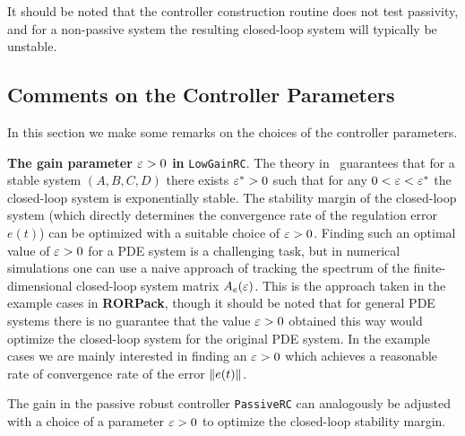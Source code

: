 \documentclass[11pt, a4paper]{amsart}
\newcommand{\COMMapproxRC}[1]{{\color{gray}#1}}
\renewcommand{\COMMapproxRC}[1]{}
\theoremstyle{definition}
\numberwithin{equation}{section}
\newcommand{\RORname}{\textbf{RORPack}}
\begin{document}
\begin{itemize}
It should be noted that the controller construction routine does not test passivity, and for a non-passive system the resulting closed-loop system will typically be unstable.

	\bigskip

     \COMMapproxRC{
     \item An ``approximate robust controller'' based on the reference~\cite{HumKur19} for finite-dimensional approximate control design for systems with infinite-dimensional output spaces.\\[1ex]
	 Calling sequence for the construction:\\[-1ex]
	   \begin{quotation}
	     \texttt{ApproximateRC(\dots)}
	   \end{quotation}
	 }
\end{itemize}

\subsection{Comments on the Controller Parameters}

In this section we make some remarks on the choices of the controller parameters.

\textbf{The gain parameter $\varepsilon>0$ in }\texttt{LowGainRC}. 
The theory in~\cite{HamPoh00,RebWei03} guarantees that for a stable system $(A,B,C,D)$ there exists $\varepsilon^\ast>0$ such that for any $0<\varepsilon<\varepsilon^\ast$ the closed-loop system is exponentially stable. The stability margin of the closed-loop system (which directly determines the convergence rate of the regulation error $e(t)$) can be optimized with a suitable choice of $\varepsilon>0$. Finding such an optimal value of $\varepsilon>0$ for a PDE system is a challenging task, but in numerical simulations one can use a naive approach of tracking the spectrum of the finite-dimensional closed-loop system matrix $A_e(\varepsilon)$. This is the approach taken in the example cases in \RORname, though it should be noted that for general PDE systems there is no guarantee that the value $\varepsilon>0$ obtained this way would optimize the closed-loop system for the original PDE system. 
In the example cases we are mainly interested in finding an $\varepsilon>0$ which achieves a reasonable rate of convergence rate of the error $\lVert e(t)\rVert$.

The gain in the passive robust controller \texttt{PassiveRC} can analogously be adjusted with a choice of a parameter $\varepsilon>0$ to optimize the closed-loop stability margin.
\end{document}
